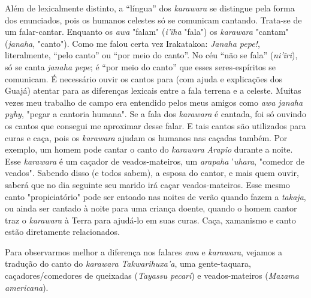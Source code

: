 Além de lexicalmente distinto, a ``língua'' dos \emph{karawara} se
distingue pela forma dos enunciados, pois os humanos celestes só se
comunicam cantando. Trata-se de um falar-cantar. Enquanto os \emph{awa}
"falam" (\emph{i'ĩha} "fala") os \emph{karawara} "cantam"
(\emph{janaha}, "canto"). Como me falou certa vez Irakatakoa:
\emph{Janaha pepe!}, literalmente, ``pelo canto'' ou ``por meio do
canto''. No céu ``não se fala'' (\emph{ni'ĩri}), só se canta
\emph{janaha pepe}; é ``por meio do canto'' que esses seres-espíritos se
comunicam. É necessário ouvir os cantos para (com ajuda e explicações
dos Guajá) atentar para as diferenças lexicais entre a fala terrena e a
celeste. Muitas vezes meu trabalho de campo era entendido pelos meus
amigos como \emph{awa janaha pyhy}, "pegar a cantoria humana". Se a fala
dos \emph{karawara} é cantada, foi só ouvindo os cantos que consegui me
aproximar desse falar. E tais cantos são utilizados para curas e caça,
pois os \emph{karawara} ajudam os humanos nas caçadas também. Por
exemplo, um homem pode cantar o canto do \emph{karawara} \emph{Arapio}
durante a noite. Esse \emph{karawara} é um caçador de veados-mateiros,
um \emph{arapaha} '\emph{uhara}, "comedor de veados". Sabendo disso (e
todos sabem), a esposa do cantor, e mais quem ouvir, saberá que no dia
seguinte seu marido irá caçar veados-mateiros. Esse mesmo canto
"propiciatório" pode ser entoado nas noites de verão quando fazem a
\emph{takaja}, ou ainda ser cantado à noite para uma criança doente,
quando o homem cantor traz o \emph{karawara} à Terra para ajudá-lo em
suas curas. Caça, xamanismo e canto estão diretamente relacionados.

Para observarmos melhor a diferença nos falares \emph{awa} e
\emph{karawara}, vejamos a tradução do canto do \emph{karawara}
\emph{Takwarihuxa'a}, uma gente-taquara, caçadores/comedores de
queixadas (\emph{Tayassu pecari}) e veados-mateiros (\emph{Mazama
americana}).




